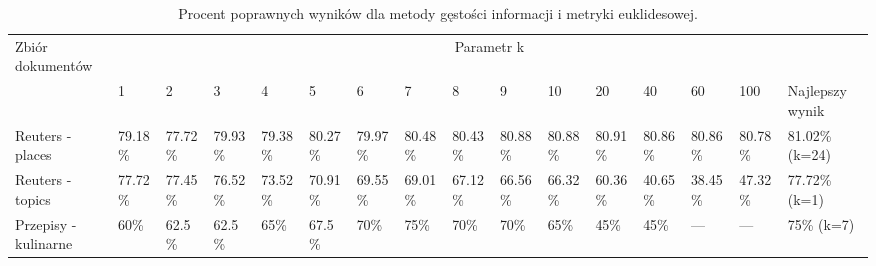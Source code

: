 \documentclass{classrep}
\begin{document}
\begingroup
{\scriptsize  
\setlength{\LTleft}{-20cm plus -1fill}
\setlength{\LTright}{\LTleft}

\begin{longtable}{|p{1cm}|p{0.7cm}|p{0.7cm}|p{0.7cm}|p{0.7cm}|p{0.7cm}|p{0.7cm}|p{0.7cm}|p{0.7cm}|p{0.7cm}|p{0.7cm}|p{0.7cm}|p{0.7cm}|p{0.7cm}|p{0.7cm}|p{1.1cm}|}
\caption{ Procent poprawnych wyników dla metody gęstości informacji i metryki euklidesowej.}\\ 
\hline

Zbiór
dokumentów

 &\multicolumn{15}{c|}{Parametr k}\\
\cline{2-16}
& 1
& 2
& 3
& 4
& 5
& 6
& 7
& 8
& 9
& 10
& 20
& 40
& 60
& 100
& Najlepszy wynik
\\ \hline\hline
Reuters
- places
& 79.18\%	%
& 77.72\%	%
& 79.93\%	%
& 79.38\%	%
& 80.27\%	%
& 79.97\%	%
& 80.48\%	%
& 80.43\%	%
& 80.88\%	%
& 80.88\%	%
& 80.91\%	%
& 80.86\%	%
& 80.86\%	%
& 80.78\%	%
& 81.02\% (k=24)

\\ \hline
Reuters
- topics
& 77.72\%	%
& 77.45\%	%
& 76.52\%	%
& 73.52\%	%
& 70.91\%	%
& 69.55\%	%
& 69.01\%	%
& 67.12\%	%
& 66.56\%	%
& 66.32\%	%
& 60.36\%	%
& 40.65\%	%
& 38.45\%	%
& 47.32\%	%
& 77.72\%	(k=1)
\\ \hline
Przepisy
- kulinarne 
& 60\%		%
& 62.5\%	%
& 62.5\%	%
& 65\%		%
& 67.5\%	%
& 70\%		%
& 75\%		%
& 70\%		%
& 70\%		%
& 65\%		%
& 45\%		%
& 45\%		%
& ---		%
& ---		%
& 75\% (k=7)
\\ \hline
\end{longtable}
}
\endgroup



\end{document}
